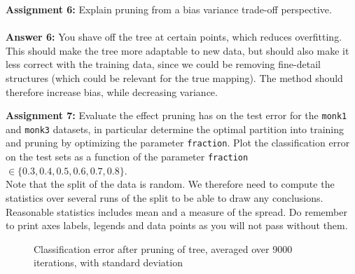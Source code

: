 \documentclass[11pt]{article}
\begin{document}
\begin{tcolorbox}
\textbf{Assignment 6:}
Explain pruning from a bias variance trade-off perspective.\\\\

\textbf{Answer 6:}
You shave off the tree at certain points, which reduces overfitting. This should make the tree more adaptable to new data, but should also make it less correct with the training data, since we could be removing fine-detail structures (which could be relevant for the true mapping). The method should therefore increase bias, while decreasing variance.
\end{tcolorbox}

\begin{tcolorbox}
\textbf{Assignment 7:} Evaluate the effect pruning has on the test
error for the \texttt{monk1} and \texttt{monk3} datasets, in
particular determine the optimal partition into training and pruning
by optimizing the parameter \texttt{fraction}.  Plot the
classification error on the test sets as a function of the parameter
\texttt{fraction} $\in \{0.3,0.4,0.5,0.6,0.7,0.8\}$. \\

Note that the split of the data is random. We therefore need to compute 
the statistics over several runs of the split to be able to draw any 
conclusions. Reasonable statistics includes mean and a measure of the spread.
Do remember to print axes labels, legends and data points as you will not pass without them.
\end{tcolorbox}

\begin{figure}[h!]
\centering
{}
\caption{Classification error after pruning of tree, averaged over 9000 iterations, with standard deviation}
\end{figure}
\end{document}
